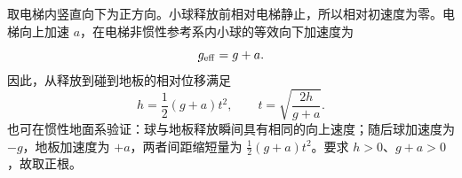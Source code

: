 取电梯内竖直向下为正方向。小球释放前相对电梯静止，所以相对初速度为零。电梯向上加速 $a$，在电梯非惯性参考系内小球的等效向下加速度为
\[
g_{\rm eff}=g+a.
\]
因此，从释放到碰到地板的相对位移满足
\[
h=\frac12(g+a)t^2,\qquad
\boxed{t=\sqrt{\frac{2h}{g+a}}}.
\]
也可在惯性地面系验证：球与地板释放瞬间具有相同的向上速度；随后球加速度为 $-g$，地板加速度为 $+a$，两者间距缩短量为 $\frac12(g+a)t^2$。要求 $h>0$、$g+a>0$，故取正根。
